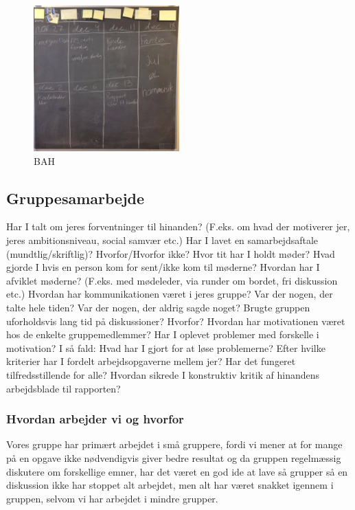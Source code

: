 \documentclass[a4paper,12pt,twoside,openright]{memoir}
\begin{document}
            \begin{figure}[ht!]
                \centering
                \includegraphics[width=0.5\textwidth]{Images/2.jpg}
                \caption{BAH}
                \label{4}
            \end{figure}

        \subsection{Gruppesamarbejde}
            Har I talt om jeres forventninger til hinanden? (F.eks. om hvad der motiverer jer, jeres ambitionsniveau, social samvær etc.) 
            Har I lavet en samarbejdsaftale (mundtlig/skriftlig)? Hvorfor/Hvorfor ikke? 
            Hvor tit har I holdt møder?  
            Hvad gjorde I hvis en person kom for sent/ikke kom til møderne? 
            Hvordan har I afviklet møderne? (F.eks. med mødeleder, via runder om bordet, fri diskussion etc.) 
            Hvordan har kommunikationen været i jeres gruppe? Var der nogen, der talte hele tiden? Var der nogen, der aldrig sagde noget? Brugte gruppen uforholdsvis lang tid på diskussioner? Hvorfor? 
            Hvordan har motivationen været hos de enkelte gruppemedlemmer? Har I oplevet problemer med forskelle i motivation? I så fald: Hvad har I gjort for at løse problemerne? 
            Efter hvilke kriterier har I fordelt arbejdsopgaverne mellem jer? Har det fungeret tilfredsstillende for alle? 
            Hvordan sikrede I konstruktiv kritik af hinandens arbejdsblade til rapporten? 

            \subsubsection{Hvordan arbejder vi og hvorfor}
            Vores gruppe har primært arbejdet i små gruppere, fordi vi mener at for mange på en opgave ikke nødvendigvis giver bedre resultat og da gruppen regelmæssig diskutere om forskellige emner, har det været en god ide at lave så grupper så en diskussion ikke har stoppet alt arbejdet, men alt har været snakket igennem i gruppen, selvom vi har arbejdet i mindre grupper. 
\end{document}
